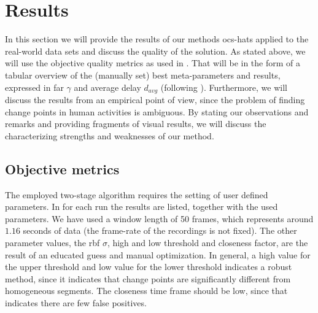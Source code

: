 \section{Results}\label{sec:real_world_results}
In this section we will provide the results of our methods \gls{ocs-hats} applied to the real-world data sets and discuss the quality of the solution.
As stated above, we will use the objective quality metrics as used in .
That will be in the form of a tabular overview of the (manually set) best meta-parameters and results, expressed in \gls{far} $\gamma$ and average delay $d_{avg}$ (following ).
Furthermore, we will discuss the results from an empirical point of view, since the problem of finding change points in human activities is ambiguous.
By stating our observations and remarks and providing fragments of visual results, we will discuss the characterizing strengths and weaknesses of our method.

\subsection{Objective metrics}
The employed two-stage algorithm requires the setting of user defined parameters.
In  for each run the results are listed, together with the used parameters.
We have used a window length of 50 frames, which represents around $1.16$ seconds of data (the frame-rate of the recordings is not fixed).
The other parameter values, \ie the \gls{rbf} $\sigma$, high and low threshold and closeness factor, are the result of an educated guess and manual optimization.
In general, a high value for the upper threshold and low value for the lower threshold indicates a robust method, since it indicates that change points are significantly different from homogeneous segments.
The closeness time frame should be low, since that indicates there are few false positives.

